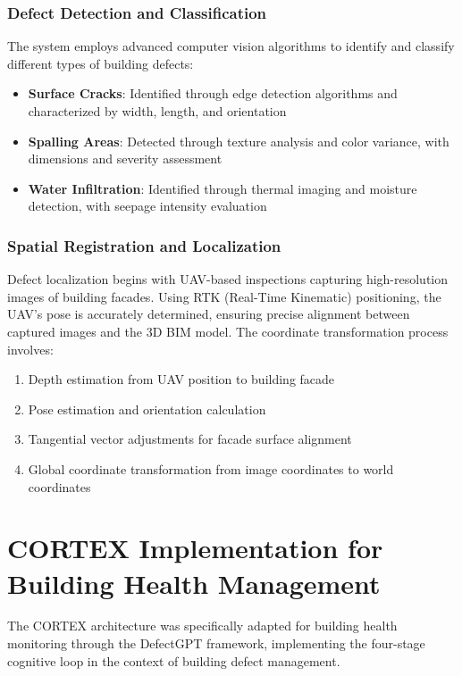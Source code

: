 \subsubsection{Defect Detection and Classification}

The system employs advanced computer vision algorithms to identify and classify different types of building defects:

\begin{itemize}
    \item \textbf{Surface Cracks}: Identified through edge detection algorithms and characterized by width, length, and orientation
    \item \textbf{Spalling Areas}: Detected through texture analysis and color variance, with dimensions and severity assessment
    \item \textbf{Water Infiltration}: Identified through thermal imaging and moisture detection, with seepage intensity evaluation
\end{itemize}

\subsubsection{Spatial Registration and Localization}

Defect localization begins with UAV-based inspections capturing high-resolution images of building facades. Using RTK (Real-Time Kinematic) positioning, the UAV's pose is accurately determined, ensuring precise alignment between captured images and the 3D BIM model. The coordinate transformation process involves:

\begin{enumerate}
    \item Depth estimation from UAV position to building facade
    \item Pose estimation and orientation calculation
    \item Tangential vector adjustments for facade surface alignment
    \item Global coordinate transformation from image coordinates to world coordinates
\end{enumerate}

\section{CORTEX Implementation for Building Health Management}

The CORTEX architecture was specifically adapted for building health monitoring through the DefectGPT framework, implementing the four-stage cognitive loop in the context of building defect management.


